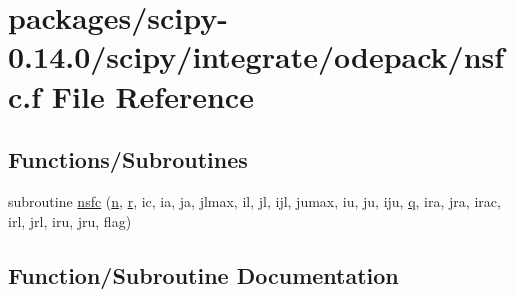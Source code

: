 \hypertarget{nsfc_8f}{}\section{packages/scipy-\/0.14.0/scipy/integrate/odepack/nsfc.f File Reference}
\label{nsfc_8f}
\subsection*{Functions/\+Subroutines}
\begin{DoxyCompactItemize}
\item 
subroutine \hyperlink{nsfc_8f_a418076fdb3d0e1bb94f2cf4fb3a26a5a}{nsfc} (\hyperlink{indexexpr_8h_ab427e2e2b4d6cec55fa088ea2a692ace}{n}, \hyperlink{indexexpr_8h_ac434fd11cc2493608d8d91424d60c17e}{r}, ic, ia, ja, jlmax, il, jl, ijl, jumax, iu, ju, iju, \hyperlink{indexexpr_8h_ac886c3584e464b5533390d7440c9dd98}{q}, ira, jra, irac, irl, jrl, iru, jru, flag)
\end{DoxyCompactItemize}


\subsection{Function/\+Subroutine Documentation}
\hypertarget{nsfc_8f_a418076fdb3d0e1bb94f2cf4fb3a26a5a}{}
